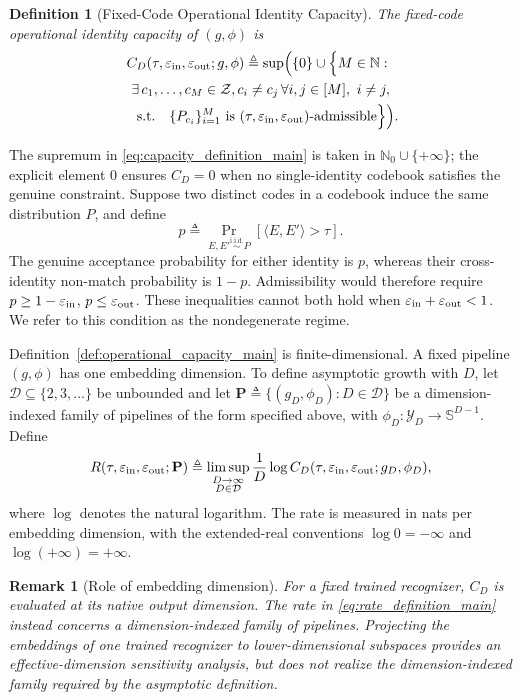 \documentclass[journal]{IEEEtran}
\def\D{\mathrm{D}} %
\newtheorem{definition}[theorem]{Definition}
\newtheorem{remark}[theorem]{Remark}
\begin{document}
\begin{bibunit}
\begin{definition}[Fixed-Code Operational Identity Capacity]
The fixed-code operational identity capacity of $(g,\phi)$ is
%
\begin{multline}
\!\!\!
C_D(\tau,\varepsilon_{\rm in},\varepsilon_{\rm out};g,\phi) \triangleq
\sup\Bigl( \{0\} \cup \Bigl\{ M\in\mathbb N:\\ \exists\,c_1,\ldots,c_M\in\mathcal Z,  c_i\ne c_j \,
\forall i,j\in[M],\ i\ne j, \\
\quad\text{s.t.}\quad \{P_{c_i}\}_{i=1}^M
\text{ is }
(\tau,\varepsilon_{\rm in},\varepsilon_{\rm out})\text{-admissible} \Bigr\}\Bigr).
\label{eq:capacity_definition_main}
\end{multline}
%
\end{definition}


The supremum in \eqref{eq:capacity_definition_main} is taken in $\mathbb N_0\cup\{+\infty\}$; the explicit element $0$ ensures $C_D=0$ when no single-identity codebook satisfies the genuine constraint. Suppose two distinct codes in a codebook induce the same distribution $P$, and define
\[
p\triangleq \Pr_{E,E'\stackrel{\mathrm{i.i.d.}}{\sim}P} \left[\langle E,E'\rangle>\tau\right].
\]
The genuine acceptance probability for either identity is $p$, whereas their cross-identity non-match probability is $1-p$. Admissibility would therefore require $p\ge1-\varepsilon_{\rm in}$, $p\le\varepsilon_{\rm out}$. These inequalities cannot both hold when $\varepsilon_{\rm in}+\varepsilon_{\rm out}<1$. We refer to this condition as the nondegenerate regime.


Definition~\ref{def:operational_capacity_main} is finite-dimensional. A fixed pipeline $(g,\phi)$ has one embedding dimension. To define asymptotic growth with $D$, let $\mathcal D\subseteq\{2,3,\ldots\}$ be unbounded and let $\mathbf P \triangleq \{(g_D,\phi_D):D\in\mathcal D\}$ be a dimension-indexed family of pipelines of the form specified above, with $\phi_D:\mathcal Y_D\to\mathbb S^{D-1}$. Define
%
\begin{equation}
R(\tau,\varepsilon_{\rm in},\varepsilon_{\rm out};\mathbf P) \triangleq
\limsup_{\substack{D\to\infty\\D\in\mathcal D}} \frac{1}{D} \log
C_D(\tau,\varepsilon_{\rm in},\varepsilon_{\rm out};g_D,\phi_D),
\label{eq:rate_definition_main}
\end{equation}
%
where $\log$ denotes the natural logarithm. The rate is measured in nats per embedding dimension, with the extended-real conventions $\log 0=-\infty$ and $\log(+\infty)=+\infty$.


\begin{remark}[Role of embedding dimension]
\label{rem:embedding_dimension_role}
%
For a fixed trained recognizer, $C_D$ is evaluated at its native output dimension. The rate in \eqref{eq:rate_definition_main} instead concerns a dimension-indexed family of pipelines. Projecting the embeddings of one trained recognizer to lower-dimensional subspaces provides an effective-dimension sensitivity analysis, but does not realize the dimension-indexed family required by the asymptotic definition.
%
\end{remark}


\end{bibunit}
\end{document}
